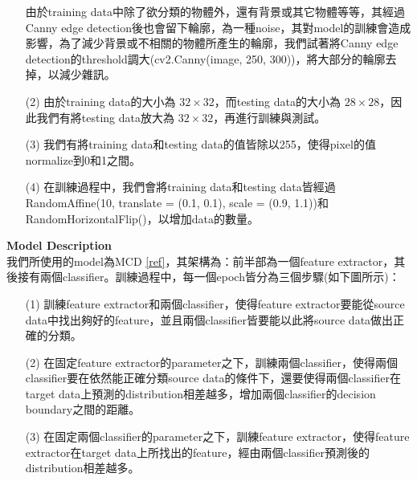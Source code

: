 \documentclass{article}
\begin{document}
\begin{enumerate}
    \item[] 由於training data中除了欲分類的物體外，還有背景或其它物體等等，其經過Canny edge detection後也會留下輪廓，為一種noise，其對model的訓練會造成影響，為了減少背景或不相關的物體所產生的輪廓，我們試著將Canny edge detection的threshold調大(cv2.Canny(image, 250, 300))，將大部分的輪廓去掉，以減少雜訊。\\
    \item[(2)] 由於training data的大小為 $32 \times 32$，而testing data的大小為 $28 \times 28$，因此我們有將testing data放大為 $32 \times 32$，再進行訓練與測試。\\
    \item[(3)] 我們有將training data和testing data的值皆除以255，使得pixel的值normalize到0和1之間。\\
    \item[(4)] 在訓練過程中，我們會將training data和testing data皆經過RandomAffine(10, translate = (0.1, 0.1), scale = (0.9, 1.1))和RandomHorizontalFlip()，以增加data的數量。\\
\end{enumerate}

\bigskip

\noindent
{\bf \LARGE Model Description}\\

我們所使用的model為MCD \href{https://github.com/mil-tokyo/MCD_DA}{[ref]}，其架構為：前半部為一個feature extractor，其後接有兩個classifier。訓練過程中，每一個epoch皆分為三個步驟(如下圖所示)：\\

\begin{enumerate}
    \item[(1)] 訓練feature extractor和兩個classifier，使得feature extractor要能從source data中找出夠好的feature，並且兩個classifier皆要能以此將source data做出正確的分類。\\
    \item[(2)] 在固定feature extractor的parameter之下，訓練兩個classifier，使得兩個classifier要在依然能正確分類source data的條件下，還要使得兩個classifier在target data上預測的distribution相差越多，增加兩個classifier的decision boundary之間的距離。\\
    \item[(3)] 在固定兩個classifier的parameter之下，訓練feature extractor，使得feature extractor在target data上所找出的feature，經由兩個classifier預測後的distribution相差越多。
\end{enumerate}
\end{document}
